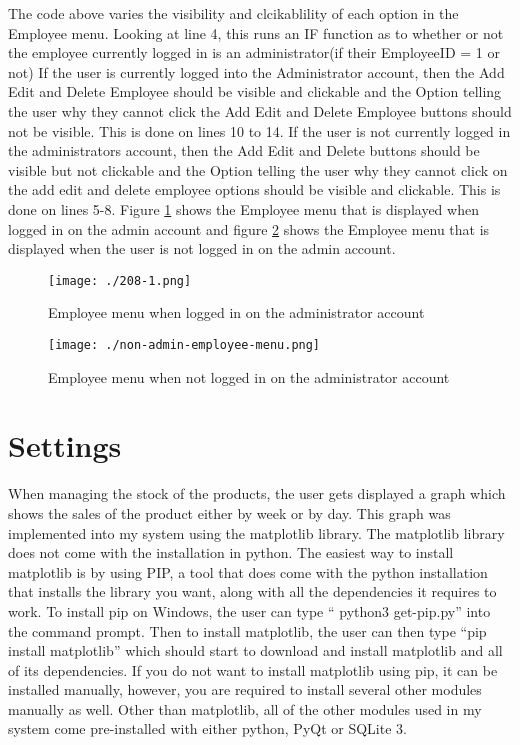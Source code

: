 The code above varies the visibility and clcikablility of each option in the Employee menu. Looking at line 4, this runs an IF function as to whether or not the employee currently logged in is an administrator(if their EmployeeID = 1 or not) If the user is currently logged into the Administrator account, then the Add Edit and Delete Employee should be visible and clickable and the Option telling the user why they cannot click the Add Edit and Delete Employee buttons should not be visible. This is done on lines 10 to 14. If the user is not currently logged in the administrators account, then the Add Edit and Delete buttons should be visible but not clickable and the Option telling the user why they cannot click on the add edit and delete employee options should be visible and clickable. This is done on lines 5-8. Figure \ref{fig:admin-employee-menu} shows the Employee menu that is displayed when logged in on the admin account and figure \ref{fig:non-admin-employee-menu} shows the Employee menu that is displayed when the user is not logged in on the admin account.



\begin{figure}[H]
\caption{Employee menu when logged in on the administrator account} \label{fig:admin-employee-menu}
\texttt{[image: ./208-1.png]}
\end{figure}


\begin{figure}[H]
\caption{Employee menu when not logged in on the administrator account} \label{fig:non-admin-employee-menu}
\texttt{[image: ./non-admin-employee-menu.png]}
\end{figure}





\section{Settings}

When managing the stock of the products, the user gets displayed a graph which shows the sales of the product either by week or by day. This graph was implemented into my system using the matplotlib library. The matplotlib library does not come with the installation in python. The easiest way to install matplotlib is by using PIP, a tool that does come with the python installation that installs the library you want, along with all the dependencies it requires to work. To install pip on Windows, the user can type `` python3 get-pip.py'' into the command prompt. Then to install matplotlib, the user can then type ``pip install matplotlib'' which should start to download and install matplotlib and all of its dependencies. If you do not want to install matplotlib using pip, it can be installed manually, however, you are required to install several other modules manually as well. Other than matplotlib, all of the other modules used in my system come pre-installed with either python, PyQt or SQLite 3.


